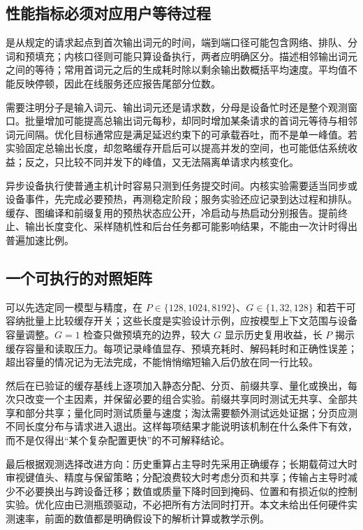 \documentclass[UTF8,12pt,a4paper,fontset=fandol]{ctexart}
\begin{document}
\subsection{性能指标必须对应用户等待过程}

是从规定的请求起点到首次输出词元的时间，端到端口径可能包含网络、排队、分词和预填充；内核口径则可能只算设备执行，两者应明确区分。描述相邻输出词元之间的等待；常用首词元之后的生成耗时除以剩余输出数概括平均速度。平均值不能反映停顿，因此在线服务还应报告尾部分位数。

需要注明分子是输入词元、输出词元还是请求数，分母是设备忙时还是整个观测窗口。批量增加可能提高总输出词元每秒，却同时增加某条请求的首词元等待与相邻词元间隔。优化目标通常应是满足延迟约束下的可承载吞吐，而不是单一峰值。若实验固定总输出长度，却忽略缓存开启后可以提高并发的空间，也可能低估系统收益；反之，只比较不同并发下的峰值，又无法隔离单请求内核变化。

异步设备执行使普通主机计时容易只测到任务提交时间。内核实验需要适当同步或设备事件，先完成必要预热，再测稳定阶段；服务实验还应记录到达过程和排队。缓存、图编译和前缀复用的预热状态应公开，冷启动与热启动分别报告。提前终止、输出长度变化、采样随机性和后台任务都可能影响结果，不能由一次计时得出普遍加速比例。

\subsection{一个可执行的对照矩阵}

可以先选定同一模型与精度，在 $P\in\{128,1024,8192\}$、$G\in\{1,32,128\}$ 和若干可容纳批量上比较缓存开关；这些长度是实验设计示例，应按模型上下文范围与设备容量调整。$G=1$ 检查只做预填充的边界，较大 $G$ 显示历史复用收益，长 $P$ 揭示缓存容量和读取压力。每项记录峰值显存、预填充耗时、解码耗时和正确性误差；超出容量的情况记为无法完成，不能悄悄缩短输入后仍放在同一行比较。

然后在已验证的缓存基线上逐项加入静态分配、分页、前缀共享、量化或换出，每次只改变一个主因素，并保留必要的组合实验。前缀共享同时测试无共享、全部共享和部分共享；量化同时测试质量与速度；淘汰需要额外测试远处证据；分页应测不同长度分布与请求进入退出。这样每项结果才能说明该机制在什么条件下有效，而不是仅得出“某个复杂配置更快”的不可解释结论。

最后根据观测选择改进方向：历史重算占主导时先采用正确缓存；长期载荷过大时审视键值头、精度与保留策略；分配浪费较大时考虑分页和共享；传输占主导时减少不必要换出与跨设备迁移；数值或质量下降时回到掩码、位置和有损近似的控制实验。优化应由已测瓶颈驱动，不必把所有方法同时打开。本文未给出任何硬件实测速率，前面的数值都是明确假设下的解析计算或教学示例。
\end{document}
